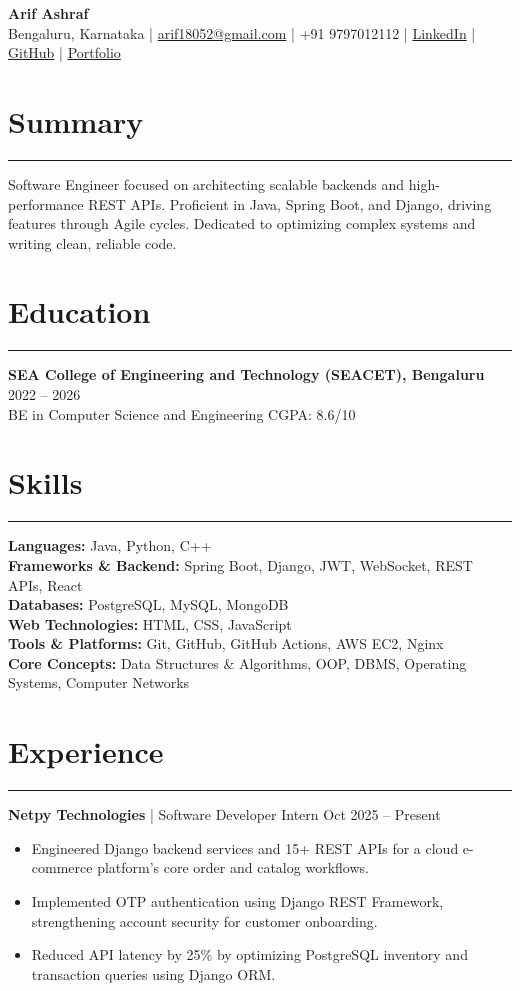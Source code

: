 \documentclass[11pt,a4paper]{article}
\newcommand{\sectionline}{\vspace{-4pt}\hrule\vspace{4pt}}
\newcommand{\blockspace}{\vspace{2pt}}
\begin{document}
\begin{center}
	{\LARGE \textbf{Arif Ashraf}} \\
	\small
	Bengaluru, Karnataka
	\; |\; \href{mailto:arif18052@gmail.com}{arif18052@gmail.com}
	\; |\; +91 9797012112
	\; |\; \href{https://www.linkedin.com/in/arif-ashraf-3abb89179}{LinkedIn}
	\; |\; \href{https://github.com/arifashraf01}{GitHub}
	\; |\; \href{https://arifashraf01.github.io/3d-portfolio-arif/}{Portfolio}
\end{center}

\section*{Summary}
\sectionline
Software Engineer focused on architecting scalable backends and high-performance REST APIs. Proficient in Java, Spring Boot, and Django, driving features through Agile cycles. Dedicated to optimizing complex systems and writing clean, reliable code.
\blockspace

\section*{Education}
\sectionline
\textbf{SEA College of Engineering and Technology (SEACET), Bengaluru}
\hfill 2022 -- 2026 \\
BE in Computer Science and Engineering
\hfill CGPA: 8.6/10

\blockspace

\section*{Skills}
\sectionline
\textbf{Languages:} Java, Python, C++ \\
\textbf{Frameworks \& Backend:} Spring Boot, Django, JWT, WebSocket, REST APIs, React \\
\textbf{Databases:} PostgreSQL, MySQL, MongoDB \\
\textbf{Web Technologies:} HTML, CSS, JavaScript \\
\textbf{Tools \& Platforms:} Git, GitHub, GitHub Actions, AWS EC2, Nginx \\
\textbf{Core Concepts:} Data Structures \& Algorithms, OOP, DBMS, Operating Systems, Computer Networks

\blockspace

\section*{Experience}
\sectionline
\textbf{Netpy Technologies} \;|\; Software Developer Intern
\hfill Oct 2025 -- Present
\begin{itemize}
	\item Engineered Django backend services and 15+ REST APIs for a cloud e-commerce platform's core order and catalog workflows.
	\item Implemented OTP authentication using Django REST Framework, strengthening account security for customer onboarding.
	\item Reduced API latency by 25\% by optimizing PostgreSQL inventory and transaction queries using Django ORM.
\end{itemize}
\end{document}
